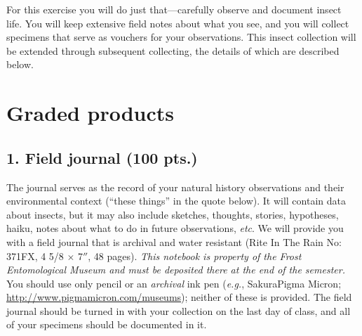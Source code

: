 \documentclass[letterpaper, 11pt]{article}
\begin{document}
For this exercise you will do just that---carefully observe and document insect life. You will keep extensive field notes about what you see, and you will collect specimens that serve as vouchers for your observations. This insect collection will be extended through subsequent collecting, the details of which are described below.

\section*{Graded products}

\subsection*{1. Field journal (100 pts.)}
The journal serves as the record of your natural history observations and their environmental context (``these things'' in the quote below). It will contain data about insects, but it may also include sketches, thoughts, stories, hypotheses, haiku, notes about what to do in future observations, \textit{etc}. We will provide you with a field journal that is archival and water resistant (Rite In The Rain No: 371FX, 4 5/8 $\times$ 7$''$, 48 pages). \textit{This notebook is property of the Frost Entomological Museum and must be deposited there at the end of the semester.} You should use only pencil or an \textit{archival} ink pen (\textit{e.g.}, Sakura\textregistered{ }Pigma Micron\textregistered; \url{http://www.pigmamicron.com/museums}); neither of these is provided. The field journal should be turned in with your collection on the last day of class, and all of your specimens should be documented in it.
\end{document}
